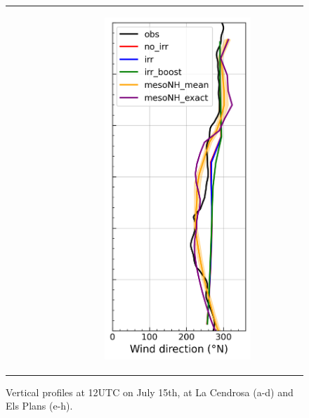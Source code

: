 \begin{figure}[hbtp]
{\begin{tabular}{@{}cccc@{}}
\begin{subfigure}[t]{0.283\textwidth}
        \end{subfigure} &
        \begin{subfigure}[t]{0.283\textwidth}
            \caption{}
            \includegraphics[width=\textwidth]{images/chap5/profiles/profile_elsplans_wind_direction_1507_.png}
        \end{subfigure} \\
    \end{tabular}
    }
    \caption{Vertical profiles at 12UTC on July 15th, at La Cendrosa (a-d) and Els Plans (e-h).}
    \label{fig:profiles_cendrosa_1507}
\end{figure}


